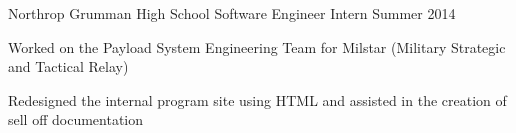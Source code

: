 \begin{cventries}
  \cventry
    {Northrop Grumman} %
    {High School Software Engineer Intern} %
    {Summer 2014} %
    {} %
    {
      \begin{cvitems} %
        \item {Worked on the Payload System Engineering Team for Milstar (Military Strategic and Tactical Relay)}
        \item {Redesigned the internal program site using HTML and assisted in the creation of sell off documentation}
      \end{cvitems}
    }

\end{cventries}
